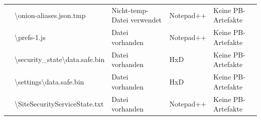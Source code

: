 \begin{appendices}
{\begin{landscape}
\begin{table}[h!]
{\begin{tabular}{cllll}
	\multicolumn{1}{|c|}{}                                                                                        & \multicolumn{1}{l|}{\cellcolor[HTML]{3190FF}\textbackslash{}onion-aliases.json.tmp}                                                            & \multicolumn{1}{l|}{\cellcolor[HTML]{FCFF2F}Nicht-temp-Datei verwendet} & \multicolumn{1}{l|}{\cellcolor[HTML]{FFFFFF}Notepad++}            & \multicolumn{1}{l|}{\cellcolor[HTML]{F8A102}Keine PB-Artefakte} \\ \cline{2-5} 
	\multicolumn{1}{|c|}{}                                                                                        & \multicolumn{1}{l|}{\cellcolor[HTML]{3190FF}\textbackslash{}prefs-1.js}                                                                        & \multicolumn{1}{l|}{\cellcolor[HTML]{009901}Datei vorhanden}            & \multicolumn{1}{l|}{\cellcolor[HTML]{FFFFFF}Notepad++}            & \multicolumn{1}{l|}{\cellcolor[HTML]{F8A102}Keine PB-Artefakte} \\ \cline{2-5} 
	\multicolumn{1}{|c|}{}                                                                                        & \multicolumn{1}{l|}{\cellcolor[HTML]{3190FF}\textbackslash{}security\_state\textbackslash{}data.safe.bin}                                      & \multicolumn{1}{l|}{\cellcolor[HTML]{009901}Datei vorhanden}            & \multicolumn{1}{l|}{\cellcolor[HTML]{FFFFFF}HxD}                  & \multicolumn{1}{l|}{\cellcolor[HTML]{F8A102}Keine PB-Artefakte} \\ \cline{2-5} 
	\multicolumn{1}{|c|}{}                                                                                        & \multicolumn{1}{l|}{\cellcolor[HTML]{3190FF}\textbackslash{}settings\textbackslash{}data.safe.bin}                                             & \multicolumn{1}{l|}{\cellcolor[HTML]{009901}Datei vorhanden}            & \multicolumn{1}{l|}{\cellcolor[HTML]{FFFFFF}HxD}                  & \multicolumn{1}{l|}{\cellcolor[HTML]{F8A102}Keine PB-Artefakte} \\ \cline{2-5} 
	\multicolumn{1}{|c|}{}                                                                                        & \multicolumn{1}{l|}{\cellcolor[HTML]{3190FF}\textbackslash{}SiteSecurityServiceState.txt}                                                      & \multicolumn{1}{l|}{\cellcolor[HTML]{009901}Datei vorhanden}            & \multicolumn{1}{l|}{\cellcolor[HTML]{FFFFFF}Notepad++}            & \multicolumn{1}{l|}{\cellcolor[HTML]{F8A102}Keine PB-Artefakte} \\ \cline{2-5} 

\end{tabular}}
\end{table}
\end{landscape}}
\end{appendices}
